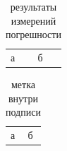 \begin{table}
  \caption{результаты измерений погрешности} %
  \label{tab:results}
  \begin{tabular}{ll}
    а & б \\
  \end{tabular}
\end{table}

\begin{table}
  \caption{метка внутри подписи\label{tab:inside}} %
  \begin{tabular}{ll}
    а & б \\
  \end{tabular}
\end{table}
